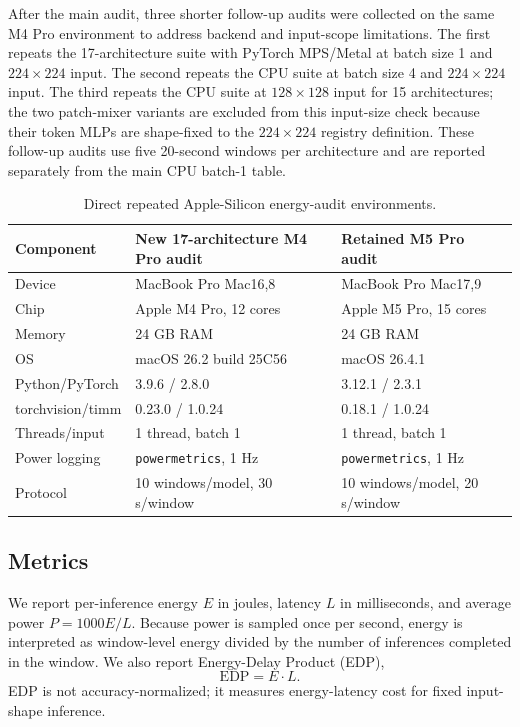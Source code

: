 \documentclass[conference]{IEEEtran}
\begin{document}
After the main audit, three shorter follow-up audits were collected on the
same M4 Pro environment to address backend and input-scope limitations. The
first repeats the 17-architecture suite with PyTorch MPS/Metal at batch size 1
and $224\times224$ input. The second repeats the CPU suite at batch size 4 and
$224\times224$ input. The third repeats the CPU suite at $128\times128$ input
for 15 architectures; the two patch-mixer variants are excluded from this
input-size check because their token MLPs are shape-fixed to the $224\times224$
registry definition. These follow-up audits use five 20-second windows per
architecture and are reported separately from the main CPU batch-1 table.

\begin{table}[t]
\centering
\caption{Direct repeated Apple-Silicon energy-audit environments.}
\label{tab:environment}
\begin{tabular}{lll}
\toprule
Component & New 17-architecture M4 Pro audit & Retained M5 Pro audit \\
\midrule
Device & MacBook Pro Mac16,8 & MacBook Pro Mac17,9 \\
Chip & Apple M4 Pro, 12 cores & Apple M5 Pro, 15 cores \\
Memory & 24 GB RAM & 24 GB RAM \\
OS & macOS 26.2 build 25C56 & macOS 26.4.1 \\
Python/PyTorch & 3.9.6 / 2.8.0 & 3.12.1 / 2.3.1 \\
torchvision/timm & 0.23.0 / 1.0.24 & 0.18.1 / 1.0.24 \\
Threads/input & 1 thread, batch 1 & 1 thread, batch 1 \\
Power logging & \texttt{powermetrics}, 1 Hz & \texttt{powermetrics}, 1 Hz \\
Protocol & 10 windows/model, 30 s/window & 10 windows/model, 20 s/window \\
\bottomrule
\end{tabular}
\end{table}

\subsection{Metrics}

We report per-inference energy $E$ in joules, latency $L$ in milliseconds, and
average power $P=1000E/L$. Because power is sampled once per second, energy is
interpreted as window-level energy divided by the number of inferences
completed in the window. We also report Energy-Delay Product (EDP),
\begin{equation}
    \mathrm{EDP} = E \cdot L.
\end{equation}
EDP is not accuracy-normalized; it measures energy-latency cost for fixed
input-shape inference.
\end{document}
